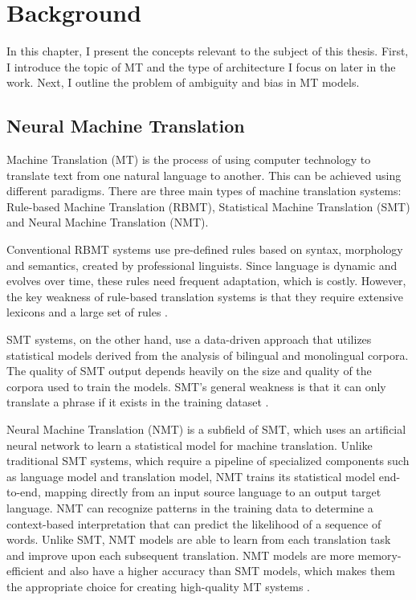 \chapter{Background}
\label{ch:Background}

In this chapter, I present the concepts relevant to the subject of this thesis. First, I introduce the topic of MT and the type of architecture I focus on later in the work. Next, I outline the problem of ambiguity and bias in MT models.


\section{Neural Machine Translation}
\label{sec:Background:NMT}

Machine Translation (MT) is the process of using computer technology to translate text from one natural language to another. This can be achieved using different paradigms. There are three main types of machine translation systems: Rule-based Machine Translation (RBMT), Statistical Machine Translation (SMT) and Neural Machine Translation (NMT). 

Conventional RBMT systems use pre-defined rules based on syntax, morphology and semantics, created by professional linguists. Since language is dynamic and evolves over time, these rules need frequent adaptation, which is costly. However, the key weakness of rule-based translation systems is that they require extensive lexicons and a large set of rules \parencite{SMT_book}. 

SMT systems, on the other hand, use a data-driven approach that utilizes statistical models derived from the analysis of bilingual and monolingual corpora. The quality of SMT output depends heavily on the size and quality of the corpora used to train the models. SMT’s general weakness is that it can only translate a phrase if it exists in the training dataset \parencite{SMT_book}.

Neural Machine Translation (NMT) is a subfield of SMT, which uses an artificial neural network to learn a statistical model for machine translation. Unlike traditional SMT systems, which require a pipeline of specialized components such as language model and translation model, NMT trains its statistical model end-to-end, mapping directly from an input source language to an output target language. NMT can recognize patterns in the training data to determine a context-based interpretation that can predict the likelihood of a sequence of words. Unlike SMT, NMT models are able to learn from each translation task and improve upon each subsequent translation. NMT models are more memory-efficient and also have a higher accuracy than SMT models, which makes them the appropriate choice for creating high-quality MT systems \parencite{NMT_book}.

